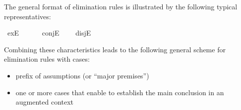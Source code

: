 \begin{isabellebody}
%
\endisatagproof
{\isafoldproof}%
%
\isadelimproof
\isanewline
%
\endisadelimproof
{}\isamarkupfalse%
%
\isamarkuptrue%
%
\isamarkuptrue%
%
\begin{isamarkuptext}%
The general format of elimination rules is illustrated by the
  following typical representatives:%
\end{isamarkuptext}%
\isamarkuptrue%
\isamarkupfalse%
\ exE\ \ \ \ \ %
\isanewline
{}\isamarkupfalse%
\ conjE\ \ \ %
\isanewline
{}\isamarkupfalse%
\ disjE\ \ \ %
%
\begin{isamarkuptext}%
Combining these characteristics leads to the following general scheme
  for elimination rules with cases:

  \begin{itemize}

  \item prefix of assumptions (or ``major premises'')

  \item one or more cases that enable to establish the main conclusion
    in an augmented context


\end{itemize}
\end{isamarkuptext}
\end{isabellebody}
